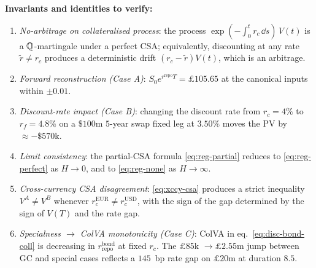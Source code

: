 \documentclass[11pt,a4paper]{article}
\begin{document}
\begin{validation}
\textbf{Invariants and identities to verify:}
\begin{enumerate}[noitemsep]
  \item \emph{No-arbitrage on collateralised process}: the process
        $\exp(-\int_0^t r_c\,\dd s)\, V(t)$ is a $\mathbb{Q}$-martingale under
        a perfect CSA; equivalently, discounting at any rate
        $\tilde r \neq r_c$ produces a deterministic drift $(r_c - \tilde r) V(t)$,
        which is an arbitrage.
  \item \emph{Forward reconstruction (Case A)}: $S_0 e^{r^{\text{repo}} T}
        = \pounds 105.65$ at the canonical inputs within $\pm 0.01$.
  \item \emph{Discount-rate impact (Case B)}: changing the discount
        rate from $r_c = 4\%$ to $r_f = 4.8\%$ on a $\$100$m
        $5$-year swap fixed leg at $3.50\%$ moves the PV by
        $\approx -\$570$k.
  \item \emph{Limit consistency}: the partial-CSA formula
        \eqref{eq:reg-partial} reduces to \eqref{eq:reg-perfect}
        as $H \to 0$, and to \eqref{eq:reg-none} as $H \to \infty$.
  \item \emph{Cross-currency CSA disagreement}: \eqref{eq:xccy-csa}
        produces a strict inequality $V^A \neq V^B$ whenever
        $r_c^{\text{EUR}} \neq r_c^{\text{USD}}$, with the sign of
        the gap determined by the sign of $V(T)$ and the rate gap.
  \item \emph{Specialness $\to$ ColVA monotonicity (Case C)}: ColVA in
        eq.~\eqref{eq:disc-bond-coll} is decreasing in
        $r^{\text{bond}}_{\text{repo}}$ at fixed $r_c$. The
        $\pounds 85$k $\to \pounds 2.55$m jump between GC and special
        cases reflects a $145$~bp rate gap on $\pounds 20$m at
        duration $8.5$.
\end{enumerate}
\end{validation}

\end{document}
